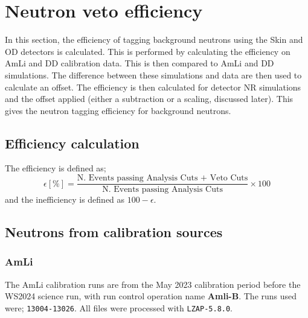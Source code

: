 \section{Neutron veto efficiency}\label{sec:VetoEff/efficiency}
In this section, the efficiency of tagging background neutrons using the Skin and OD detectors is calculated.
This is performed by calculating the efficiency on AmLi and DD calibration data.
This is then compared to AmLi and DD simulations.
The difference between these simulations and data are then used to calculate an offset.
The efficiency is then calculated for detector NR simulations and the offset applied (either a subtraction or a scaling, discussed later).
This gives the neutron tagging efficiency for background neutrons.
\subsection{Efficiency calculation}
The efficiency is defined as;
\begin{equation}
	\epsilon [\%] = \frac{\textrm{N. Events passing Analysis Cuts + Veto Cuts}}{\textrm{N. Events passing Analysis Cuts}} \times 100
	\label{eqn:VetoEff/:neutron_tagging_efficiency}
\end{equation}
and the inefficiency is defined as $100 - \epsilon$.

\subsection{Neutrons from calibration sources \label{sec:VetoEff/AmLi_Efficiency}}
\subsubsection{AmLi}
The AmLi calibration runs are from the May 2023 calibration period before the WS2024 science run, with run control operation name \textbf{Amli-B}.
The runs used were; \lstinline{13004-13026}.
All files were processed with \lstinline{LZAP-5.8.0}.

